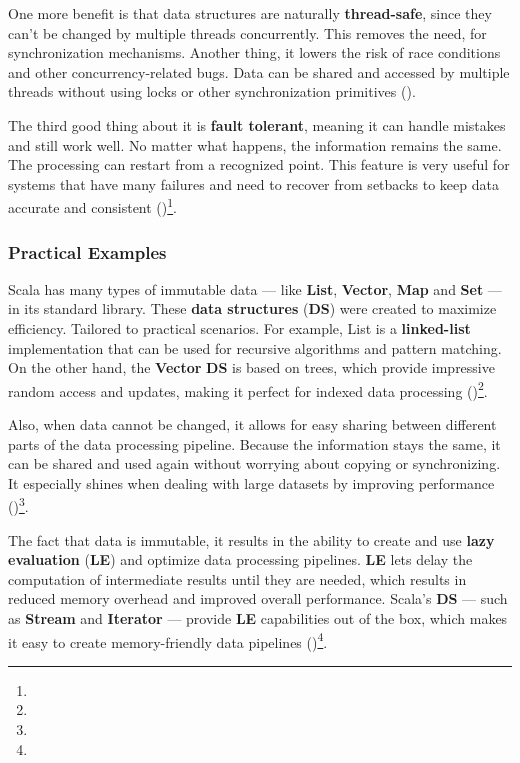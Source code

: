 One more benefit is that data structures are naturally \textbf{thread-safe}, since they can't be changed by multiple threads concurrently. This removes the need, for synchronization mechanisms. Another thing, it lowers the risk of race conditions and other concurrency-related bugs. Data can be shared and accessed by multiple threads without using locks or other synchronization primitives (\cite{milewskiFunctionalDataStructures2013})\footnotemark[8].

The third good thing about it is \textbf{fault tolerant}, meaning it can handle mistakes and still work well. No matter what happens, the information remains the same. The processing can restart from a recognized point. This feature is very useful for systems that have many failures and need to recover from setbacks to keep data accurate and consistent (\cite{milewskiFunctionalDataStructures2013})\footnote[8]{}.

\subsubsection{Practical Examples}

Scala has many types of immutable data — like \textbf{List}, \textbf{Vector}, \textbf{Map} and \textbf{Set} — in its standard library. These\textbf{ data structures} (\textbf{DS}) were created to maximize efficiency. Tailored to practical scenarios. For example, List is a \textbf{linked-list} implementation that can be used for recursive algorithms and pattern matching. On the other hand, the \textbf{Vector} \textbf{DS} is based on trees, which provide impressive random access and updates, making it perfect for indexed data processing  (\cite{scalaVector})\footnote[9]{}.



Also, when data cannot be changed, it allows for easy sharing  between different parts of the data processing pipeline. Because the information stays the same, it can be shared and used again without worrying about copying or synchronizing. It especially shines when dealing with large datasets by improving performance (\cite{tomeDataEngineeringScala2024})\footnote[10]{}.



The fact that data is immutable, it results in the ability to create and use \textbf{lazy evaluation} (\textbf{LE}) and optimize data processing pipelines. \textbf{LE} lets delay the computation of intermediate results until they are needed, which results in reduced memory overhead and improved overall performance. Scala's \textbf{DS} — such as \textbf{Stream} and \textbf{Iterator} — provide \textbf{LE} capabilities out of the box, which makes it easy to create memory-friendly data pipelines (\cite{tomeDataEngineeringScala2024})\footnote[10]{}.

